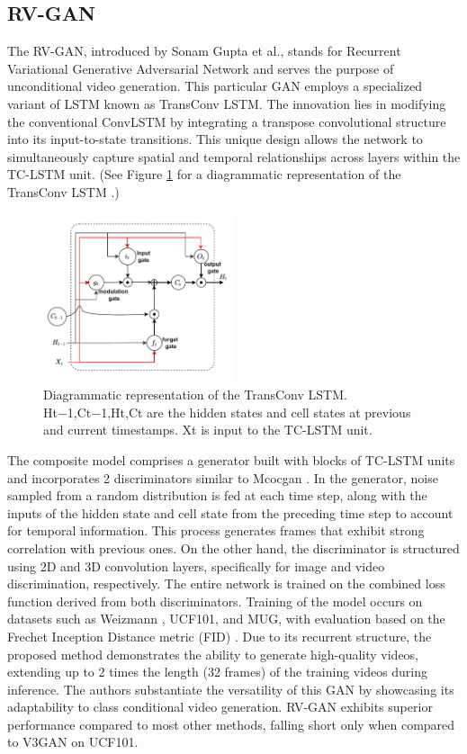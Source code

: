 \documentclass[12pt,twoside,a4paper,parskip]{scrbook} %
\begin{document}
\subsection{RV-GAN}
The RV-GAN, introduced by Sonam Gupta et al., \cite{rvgan} stands for Recurrent Variational Generative Adversarial Network and serves the purpose of unconditional video generation. This particular GAN employs a specialized variant of LSTM \cite{lstm} known as TransConv LSTM. The innovation lies in modifying the conventional ConvLSTM by integrating a transpose convolutional structure into its input-to-state transitions. This unique design allows the network to simultaneously capture spatial and temporal relationships across layers within the TC-LSTM unit. (See Figure \ref{fig:transconv} for a diagrammatic representation of the TransConv LSTM \cite{rvgan}.)

\begin{figure}[H]
    \centering
    \includegraphics[width=0.5\textwidth]{Images/transconv.png}
    \caption[ Diagrammatic representation of the TransConv LSTM]{Diagrammatic representation of the TransConv LSTM. Ht−1,Ct−1,Ht,Ct are the hidden states and cell states at previous and current timestamps. Xt is input to the TC-LSTM unit.\cite{rvgan}}
    \label{fig:transconv}
  \end{figure}

The composite model comprises a generator built with blocks of TC-LSTM units and incorporates 2 discriminators similar to Mcocgan \cite{10_mocogan}. In the generator, noise sampled from a random distribution is fed at each time step, along with the inputs of the hidden state and cell state from the preceding time step to account for temporal information. This process generates frames that exhibit strong correlation with previous ones. On the other hand, the discriminator is structured using 2D and 3D convolution layers, specifically for image and video discrimination, respectively. The entire network is trained on the combined loss function derived from both discriminators.
Training of the model occurs on datasets such as Weizmann \cite{weizmann}, UCF101\cite{UCF}, and MUG\cite{13_MUG}, with evaluation based on the Frechet Inception Distance metric (FID) \cite{fid}. Due to its recurrent structure, the proposed method demonstrates the ability to generate high-quality videos, extending up to 2 times the length (32 frames) of the training videos during inference. The authors substantiate the versatility of this GAN by showcasing its adaptability to class conditional video generation. RV-GAN exhibits superior performance compared to most other methods, falling short only when compared to V3GAN\cite{v3gan} on UCF101.
\end{document}
